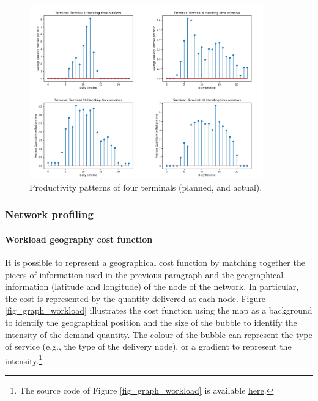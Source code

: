\begin{figure}[hbt!]
\centering
\includegraphics[width=0.9\textwidth]{SectionDistribution/control_figures/fig_terminalProductivity.png}
\captionsetup{type=figure}
\caption{Productivity patterns of four terminals (planned, and actual).}
\label{fig_terminalProductivity}
\end{figure}

\clearpage
\subsubsection{Network profiling}

\paragraph{Workload geography cost function}

It is possible to represent a geographical cost function by matching together the pieces of information used in the previous paragraph and the geographical information (latitude and longitude) of the node of the network. In particular, the cost is represented by the quantity delivered at each node. Figure \ref{fig_graph_workload} illustrates the cost function using the map as a background to identify the geographical position and the size of the bubble to identify the intensity of the demand quantity. The colour of the bubble can represent the type of service (e.g., the type of the delivery node), or a gradient to represent the intensity.\footnote{The source code of Figure \ref{fig_graph_workload} is available \href{https://github.com/aletuf93/logproj/blob/master/examples/DIST_02\%20Location\%20assessment.ipynb}{here}.}

